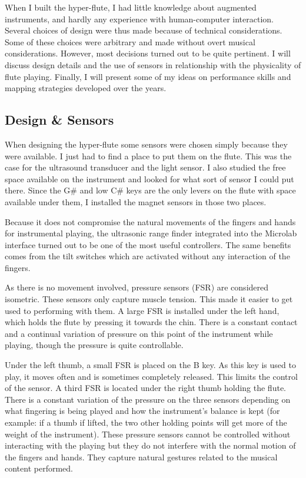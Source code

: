 When I built the hyper-flute, I had  little knowledge about augmented instruments, and hardly any experience with human-computer interaction. Several choices of design were thus made because of technical considerations. Some of these choices were arbitrary and made without overt musical considerations. However, most decisions turned out to be quite pertinent. I will discuss design details and the use of sensors in relationship with the physicality of flute playing. Finally, I will present some of my ideas on performance skills and mapping strategies developed over the years. 


\subsection{Design \& Sensors}

When designing the hyper-flute some sensors were chosen simply because they were available. I just had to find a place to put them on the flute. This was the case for the ultrasound transducer and the light sensor. I also studied the free space available on the instrument and looked for what sort of sensor I could put there.  Since the G\# and low C\# keys are the only levers on the flute with space available under them, I installed the magnet sensors in those two places.
 
Because it does not compromise the natural movements of the fingers and hands for instrumental playing, the ultrasonic range finder integrated into the Microlab interface turned out to be one of the most useful controllers.  The same benefits comes from the tilt switches which are activated without any interaction of the fingers. 

As there is no movement involved, pressure sensors (FSR) are considered isometric. These sensors only capture muscle tension. This made it easier to get used to performing with them. A large FSR is installed under the left hand, which holds the flute by pressing it towards the chin. There is a constant contact and a continual variation of pressure on this point of the instrument while playing, though the pressure is quite controllable. 

Under the left thumb, a small FSR is placed on the B key. As this key is used to play, it moves often and is sometimes completely released. This limits the control of the sensor. A third FSR is located under the right thumb holding the flute. There is a constant variation of the pressure on the three sensors depending on what fingering is being played and how the instrument's balance is kept (for example: if a thumb if lifted, the two other holding points will get more of the weight of the instrument). These pressure sensors cannot be controlled without interacting with the playing but they do not interfere with the normal motion of the fingers and hands. They capture natural gestures related to the musical content performed. 

